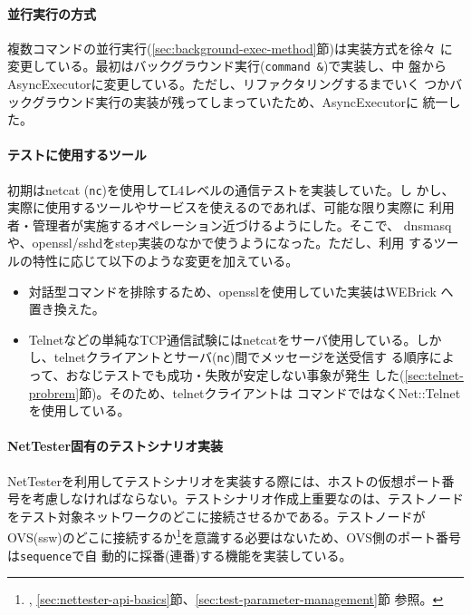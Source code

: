     \paragraph{並行実行の方式}

複数コマンドの並行実行(\ref{sec:background-exec-method}節)は実装方式を徐々
に変更している。最初はバックグラウンド実行(\verb|command &|)で実装し、中
盤からAsyncExecutorに変更している。ただし、リファクタリングするまでいく
つかバックグラウンド実行の実装が残ってしまっていたため、AsyncExecutorに
統一した。

    \paragraph{テストに使用するツール}

初期はnetcat (\verb|nc|)を使用してL4レベルの通信テストを実装していた。し
かし、実際に使用するツールやサービスを使えるのであれば、可能な限り実際に
利用者・管理者が実施するオペレーション近づけるようにした。そこで、
dnsmasqや、openssl/sshdをstep実装のなかで使うようになった。ただし、利用
するツールの特性に応じて以下のような変更を加えている。
\begin{itemize}
 \item 対話型コマンドを排除するため、opensslを使用していた実装はWEBrick
       へ置き換えた。
 \item Telnetなどの単純なTCP通信試験にはnetcatをサーバ使用している。しか
       し、telnetクライアントとサーバ(\verb|nc|)間でメッセージを送受信す
       る順序によって、おなじテストでも成功・失敗が安定しない事象が発生
       した(\ref{sec:telnet-probrem}節)。そのため、telnetクライアントは
       コマンドではなくNet::Telnetを使用している。
\end{itemize}

\paragraph{NetTester固有のテストシナリオ実装}
NetTesterを利用してテストシナリオを実装する際には、ホストの仮想ポート番
号を考慮しなければならない。テストシナリオ作成上重要なのは、テストノード
をテスト対象ネットワークのどこに接続させるかである。テストノードが
OVS(ssw)のどこに接続するか\footnote{,
\ref{sec:nettester-api-basics}節、\ref{sec:test-parameter-management}節
参照。}を意識する必要はないため、OVS側のポート番号は\verb|sequence|で自
動的に採番(連番)する機能を実装している。

